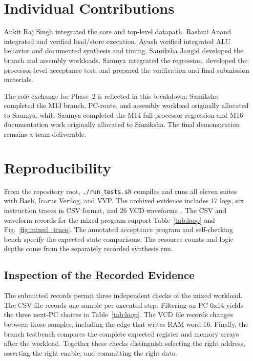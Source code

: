 \documentclass[conference,letterpaper]{IEEEtran}
\begin{document}
\section{Individual Contributions}

Ankit Raj Singh integrated the core and top-level datapath. Rashmi Anand integrated and verified load/store execution. Ayush verified integrated ALU behavior and documented synthesis and timing. Samiksha Jangid developed the branch and assembly workloads. Saumya integrated the regression, developed the processor-level acceptance test, and prepared the verification and final submission materials.

The role exchange for Phase~2 is reflected in this breakdown: Samiksha completed the M13 branch, PC-route, and assembly workload originally allocated to Saumya, while Saumya completed the M14 full-processor regression and M16 documentation work originally allocated to Samiksha. The final demonstration remains a team deliverable.

\section{Reproducibility}

From the repository root, \texttt{./run\_tests.sh} compiles and runs all eleven suites with Bash, Icarus Verilog, and VVP. The archived evidence includes 17 logs, six instruction traces in CSV format, and 26 VCD waveforms~\cite{project}. The CSV and waveform records for the mixed program support Table~\ref{tab:loop} and Fig.~\ref{fig:mixed_trace}. The annotated acceptance program and self-checking bench specify the expected state comparisons. The resource counts and logic depths come from the separately recorded synthesis run.

\subsection{Inspection of the Recorded Evidence}
The submitted records permit three independent checks of the mixed workload. The CSV file records one sample per executed step. Filtering on PC 0x14 yields the three next-PC choices in Table~\ref{tab:loop}. The VCD file records changes between those samples, including the edge that writes RAM word 16. Finally, the branch testbench compares the complete expected register and memory arrays after the workload. Together these checks distinguish selecting the right address, asserting the right enable, and committing the right data.
\end{document}
